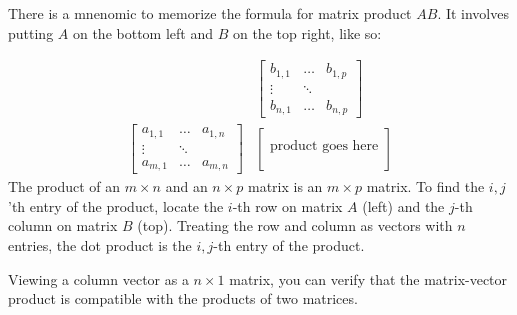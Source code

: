 \begin{remark}
	There is a mnenomic to memorize the formula for matrix product $AB$. It involves putting $A$ on the bottom left and $B$ on the top right, like so:

	\[
	\begin{array}{cc}
		&\begin{bmatrix}
			b_{1,1} & \ldots & b_{1,p}\\
			\vdots & \ddots&\\
			b_{n,1} & \ldots & b_{n,p}
		\end{bmatrix}\\
		\begin{bmatrix}
			a_{1,1} & \ldots & a_{1,n}\\
			\vdots & \ddots&\\
			a_{m,1} & \ldots & a_{m,n}
		\end{bmatrix}	& \begin{bmatrix}\\
			\textrm{product goes here}\\
			\\
		\end{bmatrix}
	\end{array}
	\]
	The product of an $m\times n$ and an $n\times p$ matrix is an $m\times p$ matrix. To find the $i,j$'th entry of the product,
	locate the $i$-th row on matrix $A$ (left) and the $j$-th column on matrix $B$ (top). Treating the row and column as vectors with $n$ entries, the dot product is the $i,j$-th entry of the product.
\end{remark}
\begin{remark}
	Viewing a column vector as a $n\times 1$ matrix, you can verify that the matrix-vector product is compatible with the products of two matrices.
\end{remark}


